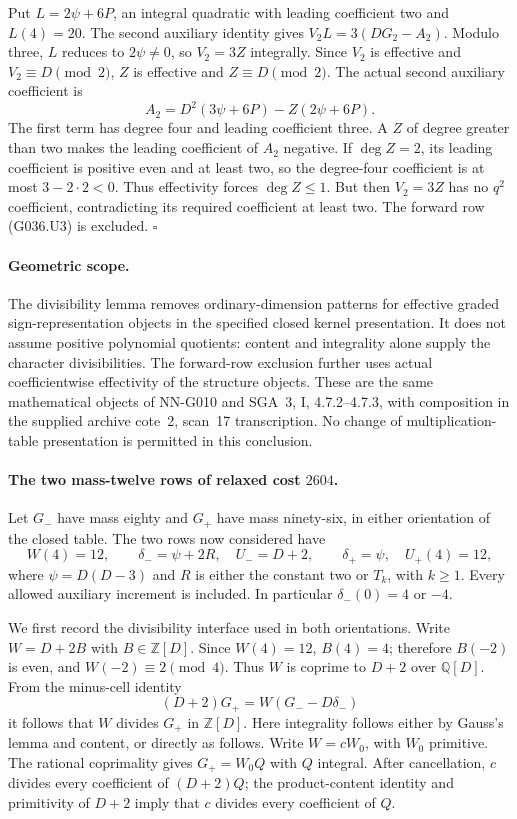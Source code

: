 Put $L=2\psi+6P$, an integral quadratic with
leading coefficient two and $L(4)=20$.
The second auxiliary identity gives
$V_2L=3(DG_2-A_2)$.
Modulo three, $L$ reduces to $2\psi\ne0$,
so $V_2=3Z$ integrally.
Since $V_2$ is effective and $V_2\equiv D\pmod2$,
$Z$ is effective and $Z\equiv D\pmod2$.
The actual second auxiliary coefficient is
\[
              A_2=D^2(3\psi+6P)-Z(2\psi+6P).       \tag{G036.U5}
\]
The first term has degree four and leading
coefficient three. A $Z$ of degree greater
than two makes the leading coefficient of
$A_2$ negative. If $\deg Z=2$, its leading
coefficient is positive even and at least two,
so the degree-four coefficient is at most
$3-2\cdot2<0$.
Thus effectivity forces $\deg Z\le1$.
But then $V_2=3Z$ has no $q^2$ coefficient,
contradicting its required coefficient at least two.
The forward row (G036.U3) is excluded.
\hfill$\square$

\paragraph{Geometric scope.}
The divisibility lemma removes ordinary-dimension
patterns for effective graded sign-representation
objects in the specified closed kernel presentation.
It does not assume positive polynomial quotients:
content and integrality alone supply the character
divisibilities. The forward-row exclusion further
uses actual coefficientwise effectivity of the
structure objects. These are the same mathematical
objects of NN-G010 and SGA~3, I, 4.7.2--4.7.3,
with composition in the supplied archive
cote~2, scan~17 transcription. No change of
multiplication-table presentation is permitted
in this conclusion.

\paragraph{The two mass-twelve rows of relaxed cost $2604$.}
Let $G_-$ have mass eighty and $G_+$ have mass ninety-six,
in either orientation of the closed table. The two rows now considered have
\[
 W(4)=12,\qquad \delta_- =\psi+2R,\quad U_-=D+2,
 \qquad \delta_+=\psi,\quad U_+(4)=12,
\]
where $\psi=D(D-3)$ and $R$ is either the constant two or $T_k$,
with $k\ge1$. Every allowed auxiliary increment is included.
In particular $\delta_-(0)=4$ or $-4$.

We first record the divisibility interface used in both orientations.
Write $W=D+2B$ with $B\in\mathbb Z[D]$. Since $W(4)=12$,
$B(4)=4$; therefore $B(-2)$ is even, and
$W(-2)\equiv2\pmod4$. Thus $W$ is coprime to $D+2$
over $\mathbb Q[D]$. From the minus-cell identity
\[
                 (D+2)G_+=W(G_--D\delta_-)
\]
it follows that $W$ divides $G_+$ in $\mathbb Z[D]$.
Here integrality follows either by Gauss's lemma and content,
or directly as follows. Write $W=cW_0$, with $W_0$ primitive.
The rational coprimality gives $G_+=W_0Q$ with $Q$ integral.
After cancellation, $c$ divides every coefficient of $(D+2)Q$;
the product-content identity and primitivity of $D+2$ imply
that $c$ divides every coefficient of $Q$.


